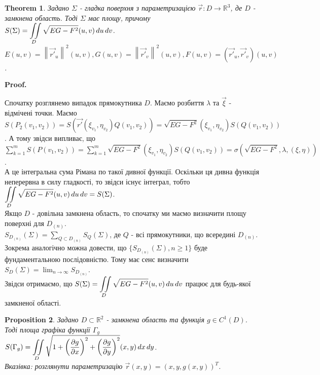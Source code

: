\documentclass[a4paper, 10pt]{article}
\makeatletter
\def\departial#1#2{\dfrac{\partial {#1}}{\partial {#2}}}
\def\qed{$\blacksquare$}
\theoremstyle{theoremdd}
\newtheorem{theorem}{Theorem}[subsection]
\theoremstyle{theoremdd}
\theoremstyle{theoremdd}
\theoremstyle{theoremdd}
\theoremstyle{theoremdd}
\newtheorem{proposition}[theorem]{Proposition}
\theoremstyle{theoremdd}
\theoremstyle{theoremdd}
\theoremstyle{theoremdd}
\renewenvironment{proof}[1][Proof.\\]{\par
\pushQED{\hfill \qed}%
\normalfont \topsep6\p@\@plus6\p@\relax
\trivlist
\item\relax
{\bfseries
#1\@addpunct{.}}\hspace\labelsep\ignorespaces
}{%
\popQED\endtrivlist\@endpefalse
}
\newcommand\Norm[1]{\left\lVert#1\right\rVert}
\makeatother
\begin{document}
\begin{theorem}
Задано $\Sigma$ - гладка поверхня з параметризацією $\vec{r}: D \to \mathbb{R}^3$, де $D$ - замкнена область. Тоді $\Sigma$ має площу, причому\\
$S(\Sigma) = \displaystyle\iint\displaylimits_D \sqrt{EG - F^2}(u,v)\,du\,dv$.\\
$E(u,v) = \Norm{\vec{r'}_u}^2(u,v), G(u,v) = \Norm{\vec{r'}_v}^2(u,v), F(u,v) = (\vec{r'}_u, \vec{r'}_v)(u,v)$.
\end{theorem}

\begin{proof}
Спочатку розглянемо випадок прямокутника $D$. Маємо розбиття $\lambda$ та $\vec{\xi}$ - відмічені точки. Маємо\\
$S(P_2(v_1,v_2)) = S(\vec{r'}(\xi_{v_1},\eta_{v_2})Q(v_1,v_2)) = \sqrt{EG-F^2}(\xi_{v_1},\eta_{v_2}) S(Q(v_1,v_2))$. А тому звідси випливає, що\\
$\displaystyle\sum_{k=1}^m S(P(v_1,v_2)) = \sum_{k=1}^m \sqrt{EG-F^2}(\xi_{v_1},\eta_{v_2}) S(Q(v_1,v_2)) = \sigma( \sqrt{EG-F^2}, \lambda, (\xi,\eta))$.\\
А це інтегральна сума Рімана по такої дивної функції. Оскільки ця дивна функція неперервна в силу гладкості, то звідси існує інтеграл, тобто\\
$\displaystyle\iint\displaylimits_{D} \sqrt{EG-F^2}(u,v)\,du\,dv = S(\Sigma)$.
\bigskip \\
Якщо $D$ - довільна замкнена область, то спочатку ми маємо визначити площу поверхні для $D_{(n)}$.\\
$S_{D_{(n)}}(\Sigma) = \displaystyle\sum_{Q \subset D_{(n)}} S_Q(\Sigma)$, де $Q$ - всі прямокутники, що всередині $D_{(n)}$. Зокрема аналогічно можна довести, що $\{ S_{D_{(n)}}(\Sigma), n \geq 1 \}$ буде фундаментальною послідовністю. Тому має сенс визначити\\
$S_D(\Sigma) = \displaystyle\lim_{n \to \infty} S_{D_{(n)}}$.\\
Звідси отримаємо, що $S(\Sigma) = \displaystyle\iint\displaylimits_D \sqrt{EG - F^2}(u,v)\,du\,dv$ працює для будь-якої замкненої області.
\end{proof}

\begin{proposition}
Задано $D \subset \mathbb{R}^2$ - замкнена область та функція $g \in C^1(D)$. Тоді площа графіка функції $\Gamma_g$\\
$S(\Gamma_g) = \displaystyle\iint\displaylimits_D \sqrt{1+ \left(\departial{g}{x} \right)^2 + \left(\departial{g}{y} \right)^2 } (x,y)\,dx\,dy$.\\
\textit{Вказівка: розглянути параметризацію $\vec{r}(x,y) = (x,y,g(x,y))^T$.}
\end{proposition}
\end{document}
